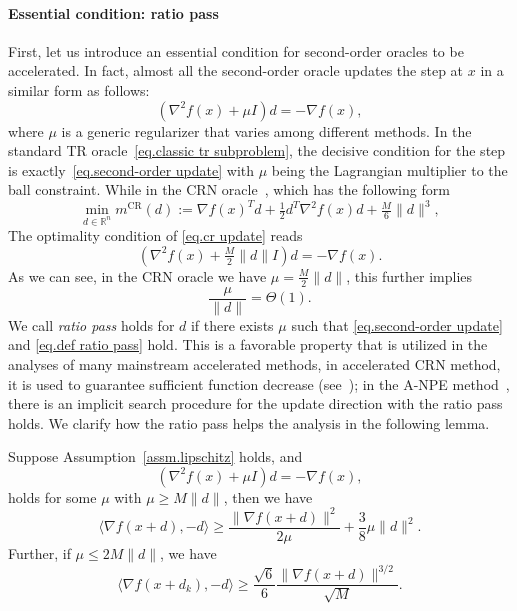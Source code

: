 \documentclass{mcom-l}
\numberwithin{equation}{section}
\begin{document}
\paragraph{Essential condition: ratio pass}
First, let us introduce an essential condition for second-order oracles to be accelerated. In fact, almost all the second-order oracle updates the step at $x$ in a similar form as follows:
\begin{equation}
    \label{eq.second-order update}
    \left (\nabla^2 f(x) + \mu I \right )d = -\nabla f(x),
\end{equation}
where $\mu$ is a generic regularizer that varies among different methods. In the standard TR oracle~\eqref{eq.classic tr subproblem}, the decisive condition for the step is exactly~\eqref{eq.second-order update} with $\mu$ being the Lagrangian multiplier to the ball constraint. While in the CRN oracle~\cite{nesterov2006cubic}, which has the following form
\begin{equation}
    \label{eq.cr update}
    \min_{d\in\mathbb{R}^n} m^{\text{CR}}(d):=\nabla f(x)^Td+\tfrac{1}{2}d^T\nabla^2 f(x)d+\tfrac{M}{6}\|d\|^3,
\end{equation}
The optimality condition of \eqref{eq.cr update} reads
\begin{equation}\label{eq.cropt}
    (\nabla^2 f(x) + \tfrac{M}{2}\|d\| I)d = -\nabla f(x).
\end{equation}
As we can see, in the CRN oracle we have $\mu = \frac{M}{2}\|d\|$, this further implies
\begin{equation}\label{eq.def ratio pass}
    \frac{\mu}{\|d\|} = \Theta(1).
\end{equation}
We call \textit{ratio pass} holds for $d$ if there exists $\mu$ such that \eqref{eq.second-order update} and \eqref{eq.def ratio pass} hold. This is a favorable property that is utilized in the analyses of many mainstream accelerated methods, in accelerated CRN method, it is used to guarantee sufficient function decrease (see~\citet[Lemma 4.2.5]{nesterov2008accelerating}); in the A-NPE method~\cite{monteiro2013accelerated}, there is an implicit search procedure for the update direction with the ratio pass holds. We clarify how the ratio pass helps the analysis in the following lemma.
\begin{lemma}
    \label{lem.inner product g and d}
    Suppose Assumption~\ref{assm.lipschitz} holds, and
    \begin{equation}
        \label{eq.regularized condition for d}
        \left (\nabla^2 f(x)+\mu I\right)d = -\nabla f(x),
    \end{equation}
    holds for some $\mu$ with $\mu\geq M \|d\|$, then we have
    \begin{equation}
        \label{eq.inner product g d}
        \langle \nabla f(x+d),-d \rangle \geq \frac{\|\nabla f(x+d)\|^2}{2\mu}+\frac{3}{8}\mu \|d\|^2.
    \end{equation}
    Further, if $\mu \leq 2M\|d\|$, we have
    \begin{equation}
        \label{eq.inner product g d advanced}
        \langle \nabla f(x+d_k),-d \rangle \geq \frac{\sqrt{6}}{6} \frac{\|\nabla f(x+d)\|^{3/2}}{\sqrt{M}}.
    \end{equation}
\end{lemma}
\end{document}
